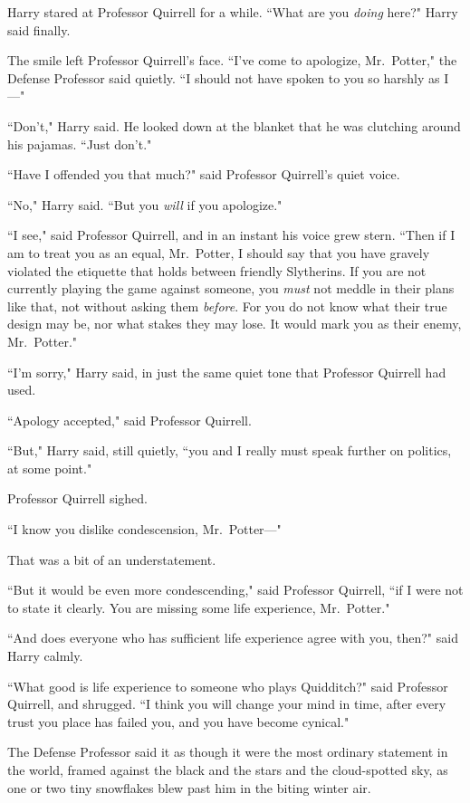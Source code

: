 Harry stared at Professor Quirrell for a while. ``What are you \emph{doing} here?" Harry said finally.

The smile left Professor Quirrell's face. ``I've come to apologize, Mr.~Potter," the Defense Professor said quietly. ``I should not have spoken to you so harshly as I—"

``Don't," Harry said. He looked down at the blanket that he was clutching around his pajamas. ``Just don't."

``Have I offended you that much?" said Professor Quirrell's quiet voice.

``No," Harry said. ``But you \emph{will} if you apologize."

``I see," said Professor Quirrell, and in an instant his voice grew stern. ``Then if I am to treat you as an equal, Mr.~Potter, I should say that you have gravely violated the etiquette that holds between friendly Slytherins. If you are not currently playing the game against someone, you \emph{must} not meddle in their plans like that, not without asking them \emph{before}. For you do not know what their true design may be, nor what stakes they may lose. It would mark you as their enemy, Mr.~Potter."

``I'm sorry," Harry said, in just the same quiet tone that Professor Quirrell had used.

``Apology accepted," said Professor Quirrell.

``But," Harry said, still quietly, ``you and I really must speak further on politics, at some point."

Professor Quirrell sighed.

``I know you dislike condescension, Mr.~Potter—"

That was a bit of an understatement.

``But it would be even more condescending," said Professor Quirrell, ``if I were not to state it clearly. You are missing some life experience, Mr.~Potter."

``And does everyone who has sufficient life experience agree with you, then?" said Harry calmly.

``What good is life experience to someone who plays Quidditch?" said Professor Quirrell, and shrugged. ``I think you will change your mind in time, after every trust you place has failed you, and you have become cynical."

The Defense Professor said it as though it were the most ordinary statement in the world, framed against the black and the stars and the cloud-spotted sky, as one or two tiny snowflakes blew past him in the biting winter air.

